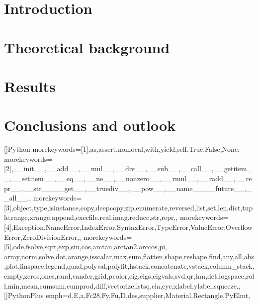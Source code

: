 \documentclass[a4paper, 12pt]{article}
\begin{document}

\section{Introduction}


\newpage

\section{Theoretical background}


\newpage
\section{Results}

\newpage
\section{Conclusions and outlook}



\newpage


\newpage

\appendix

[]{Python}{
  morekeywords=[1]{,as,assert,nonlocal,with,yield,self,True,False,None,} %
  morekeywords=[2]{,__init__,__add__,__mul__,__div__,__sub__,__call__,__getitem__,__setitem__,__eq__,__ne__,__nonzero__,__rmul__,__radd__,__repr__,__str__,__get__,__truediv__,__pow__,__name__,__future__,__all__,}, %
  morekeywords=[3]{,object,type,isinstance,copy,deepcopy,zip,enumerate,reversed,list,set,len,dict,tuple,range,xrange,append,execfile,real,imag,reduce,str,repr,}, %
  morekeywords=[4]{,Exception,NameError,IndexError,SyntaxError,TypeError,ValueError,OverflowError,ZeroDivisionError,}, %
  morekeywords=[5]{,ode,fsolve,sqrt,exp,sin,cos,arctan,arctan2,arccos,pi, array,norm,solve,dot,arange,isscalar,max,sum,flatten,shape,reshape,find,any,all,abs,plot,linspace,legend,quad,polyval,polyfit,hstack,concatenate,vstack,column_stack,empty,zeros,ones,rand,vander,grid,pcolor,eig,eigs,eigvals,svd,qr,tan,det,logspace,roll,min,mean,cumsum,cumprod,diff,vectorize,lstsq,cla,eye,xlabel,ylabel,squeeze,}, %
}
[]{PythonPlus}{
  emph={d,E,a,Fc28,Fy,Fu,D,des,supplier,Material,Rectangle,PyElmt},
}
\end{document}
